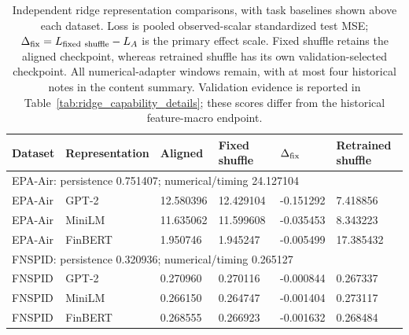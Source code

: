\begin{table}[htbp]
\centering\footnotesize
\setlength{\tabcolsep}{4pt}
\caption{Independent ridge representation comparisons, with task baselines shown above each dataset. Loss is pooled observed-scalar standardized test MSE; $\Delta_{\rm fix}=L_{\rm fixed\ shuffle}-L_A$ is the primary effect scale. Fixed shuffle retains the aligned checkpoint, whereas retrained shuffle has its own validation-selected checkpoint. All numerical-adapter windows remain, with at most four historical notes in the content summary. Validation evidence is reported in Table~\ref{tab:ridge_capability_details}; these scores differ from the historical feature-macro endpoint.}
\label{tab:representations}
\begin{tabular}{llllll}
\toprule
Dataset & Representation & Aligned & Fixed shuffle & $\Delta_{\rm fix}$ & Retrained shuffle\\
\midrule
\multicolumn{6}{l}{EPA-Air: persistence 0.751407; numerical/timing 24.127104}\\
EPA-Air & GPT-2 & 12.580396 & 12.429104 & -0.151292 & 7.418856\\
EPA-Air & MiniLM & 11.635062 & 11.599608 & -0.035453 & 8.343223\\
EPA-Air & FinBERT & 1.950746 & 1.945247 & -0.005499 & 17.385432\\
\multicolumn{6}{l}{FNSPID: persistence 0.320936; numerical/timing 0.265127}\\
FNSPID & GPT-2 & 0.270960 & 0.270116 & -0.000844 & 0.267337\\
FNSPID & MiniLM & 0.266150 & 0.264747 & -0.001404 & 0.273117\\
FNSPID & FinBERT & 0.268555 & 0.266923 & -0.001632 & 0.268484\\
\bottomrule
\end{tabular}
\end{table}

